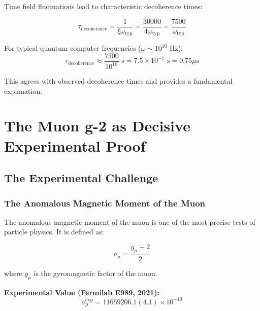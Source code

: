 \documentclass[12pt,a4paper]{report}
\newcommand{\xipar}{\xi}      %
\begin{document}
	Time field fluctuations lead to characteristic decoherence times:
	
	\begin{equation}\label{eq:decoherence_time}
		\tau_{\text{decoherence}} = \frac{1}{\xipar \omega_{\text{typ}}} = \frac{30000}{4 \omega_{\text{typ}}} = \frac{7500}{\omega_{\text{typ}}}
	\end{equation}
	
	For typical quantum computer frequencies ($\omega \sim 10^{10}$ Hz):
	\begin{equation}
		\tau_{\text{decoherence}} \approx \frac{7500}{10^{10}} \text{ s} = 7.5 \times 10^{-7} \text{ s} = 0.75 \mu\text{s}
	\end{equation}
	
	This agrees with observed decoherence times and provides a fundamental explanation.
	\chapter{The Muon g-2 as Decisive Experimental Proof}\label{chap:muon_g2}
	
	\section{The Experimental Challenge}\label{sec:muon_g2_experiment}
	
	\subsection{The Anomalous Magnetic Moment of the Muon}\label{subsec:anomalous_magnetic_moment}
	
	The anomalous magnetic moment of the muon is one of the most precise tests of particle physics. It is defined as:
	
	\begin{equation}\label{eq:anomalous_moment_definition}
		a_\mu = \frac{g_\mu - 2}{2}
	\end{equation}
	
	where $g_\mu$ is the gyromagnetic factor of the muon.
	
	\textbf{Experimental Value (Fermilab E989, 2021):}
	\begin{equation}\label{eq:experimental_value}
		a_\mu^{\text{exp}} = 11659206.1(4.1) \times 10^{-10}
	\end{equation}
	
\end{document}
